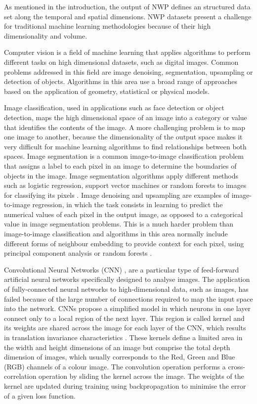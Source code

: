 \documentclass[twocol]{ametsoc}
\begin{document}
As mentioned in the introduction, the output of NWP defines an structured data set along the temporal and spatial dimensions. NWP datasets present a challenge for traditional machine learning methodologies because of their high dimensionality and volume. 

Computer vision is a field of machine learning that applies algorithms to perform different tasks on high dimensional datasets, such as digital images. Common problems addressed in this field are image denoising, segmentation, upsampling or detection of objects. Algorithms in this area use a broad range of approaches based on the application of geometry, statistical or physical models. 

Image classification, used in applications such as face detection or object detection, maps the high dimensional space of an image into a category \citep{haralick1973textural} or value \citep{takeda2007kernel} that identifies the contents of the image. A more challenging problem is to map one image to another, because the dimensionality of the output space makes it very difficult for machine learning algorithms to find relationships between both spaces. Image segmentation is a common image-to-image classification problem that assigns a label to each pixel in an image to determine the boundaries of objects in the image. Image segmentation algorithms apply different methods such as logistic regression, support vector machines or random forests to images for classifying its pixels \citep{haralick1985image,pal1993review,pal2005random}. Image denoising and upsampling are examples of image-to-image regression, in which the task consists in learning to predict the numerical values of each pixel in the output image, as opposed to a categorical value in image segmentation problems. This is a much harder problem than image-to-image classification and algorithms in this area normally include different forms of neighbour embedding to provide context for each pixel, using principal component analysis or random forests \citep{chang2004super,schulter2015fast}.

Convolutional Neural Networks (CNN) \citep{lecun2010convolutional}, are a particular type of feed-forward artificial neural networks specifically designed to analyse images. The application of fully-connected neural networks to high-dimensional data, such as images, has failed because of the large number of connections required to map the input space into the network. CNNs propose a simplified model in which neurons in one layer connect only to a local region of the next layer. This region is called kernel and its weights are shared across the image for each layer of the CNN, which results in translation invariance characteristics \citep{scherer2010evaluation}. These kernels define a limited area in the width and height dimensions of an image but comprise the total depth dimension of images, which usually corresponds to the Red, Green and Blue (RGB) channels of a colour image. The convolution operation performs a cross-correlation operation by sliding the kernel across the image. The weights of the kernel are updated during training using backpropagation \citep{widrow199030} to minimise the error of a given loss function. 
\end{document}
